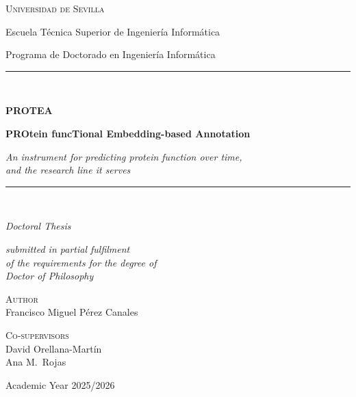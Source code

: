 \begin{titlepage}
  \centering
  \vspace*{1.2cm}


  {\Large\scshape Universidad de Sevilla\par}
  \vspace{0.4cm}
  {\large Escuela T\'{e}cnica Superior de Ingenier\'{i}a Inform\'{a}tica\par}
  \vspace{0.15cm}
  {\large Programa de Doctorado en Ingenier\'{i}a Inform\'{a}tica\par}

  \vspace{2.6cm}

  {\color{proteagreen}\rule{\linewidth}{0.4pt}}\\[0.6cm]
  {\huge\bfseries PROTEA\par}
  \vspace{0.35cm}
  {\Large\bfseries PROtein funcTional Embedding-based Annotation\par}
  \vspace{0.45cm}
  {\large\itshape An instrument for predicting protein function over time,\\
  and the research line it serves\par}
  \vspace{0.6cm}
  {\color{proteagreen}\rule{\linewidth}{0.4pt}}\\[1.3cm]

  {\Large\itshape Doctoral Thesis\par}
  \vspace{0.35cm}
  {\large\itshape submitted in partial fulfilment\\
  of the requirements for the degree of\\
  Doctor of Philosophy\par}

  \vspace{2.0cm}

  \begin{minipage}[t]{0.46\textwidth}
    \begin{flushleft}
      \large
      {\scshape\color{proteagreen} Author}\\[0.15cm]
      Francisco Miguel P\'{e}rez Canales
    \end{flushleft}
  \end{minipage}
  \hfill
  \begin{minipage}[t]{0.46\textwidth}
    \begin{flushright}
      \large
      {\scshape\color{proteagreen} Co-supervisors}\\[0.15cm]
      David Orellana-Mart\'{i}n\\
      Ana M.\ Rojas
    \end{flushright}
  \end{minipage}

  \vfill

  {\large Academic Year 2025/2026\par}
\end{titlepage}
